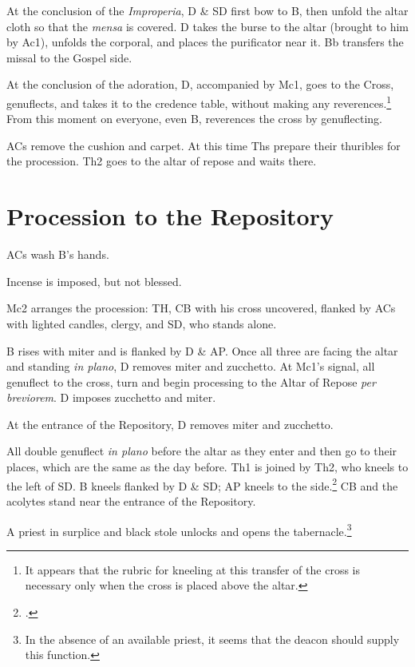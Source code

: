 {    \rubric At the conclusion of the \textit{Improperia}, D \& SD first bow to
    B, then unfold the altar cloth so that the \textit{mensa} is covered. D
    takes the burse to the altar (brought to him by Ac1), unfolds the corporal,
    and places the purificator near it. Bb transfers the missal to the Gospel
    side.

    \rubric At the conclusion of the adoration, D, accompanied by Mc1, goes to
    the Cross, genuflects, and takes it to the credence table, without making
    any reverences.\footnote{It appears that the rubric for kneeling at this
        transfer of the cross is necessary only when the cross is placed above
        the altar.} From this moment on everyone, even B, reverences the cross
        by genuflecting.

    \rubric ACs remove the cushion and carpet. At this time Ths prepare their
    thuribles for the procession. Th2 goes to the altar of repose and waits
    there.

\section{Procession to the Repository}

    \rubric ACs wash B's hands.

    \rubric Incense is imposed, but not blessed.

    \rubric Mc2 arranges the procession: TH, CB with his cross uncovered,
    flanked by ACs with lighted candles, clergy, and SD, who stands alone.

    
    \rubric B rises with miter and is flanked by D \& AP. Once all three are
    facing the altar and standing \textit{in plano}, D removes miter and
    zucchetto. At Mc1's signal, all genuflect to the cross, turn and begin
    processing to the Altar of Repose \textit{per breviorem}. D imposes
    zucchetto and miter.

    \rubric At the entrance of the Repository, D removes miter and zucchetto.

    \rubric All double genuflect \textit{in plano} before the altar as they
    enter and then go to their places, which are the same as the day before.
    Th1 is joined by Th2, who kneels to the left of SD. B kneels flanked by D
    \& SD; AP kneels to the side.\footcite[][]{sterkyFP:2} CB and the acolytes
    stand near the entrance of the Repository.

    \rubric A priest in surplice and black stole unlocks and opens the
    tabernacle.\footnote{In the absence of an available priest, it seems that
    the deacon should supply this function.}

}
